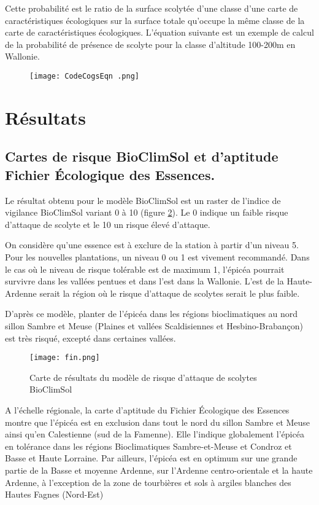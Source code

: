 Cette probabilité est le ratio de la surface scolytée d'une classe d'une carte de caractéristiques écologiques sur la surface totale qu'occupe la même classe de la carte de caractéristiques écologiques.
L'équation suivante est un exemple de calcul de la probabilité de présence de scolyte pour la classe d'altitude 100-200m en Wallonie.

\begin{figure} [htbp] 
    \centering
    \texttt{[image: CodeCogsEqn .png]}
   
    \label{fig:eq}
\end{figure}
\nexpage
\section{Résultats}

\subsection{Cartes de risque BioClimSol et d'aptitude Fichier Écologique des Essences.}
Le résultat obtenu pour le modèle BioClimSol est un raster de l'indice de vigilance BioClimSol variant 0 à 10 (figure \ref{fig:fin}). Le 0 indique un faible risque d’attaque de scolyte et le 10 un risque élevé d’attaque.


On considère qu'une essence est à exclure de la station à partir d'un niveau 5. Pour les nouvelles plantations, un niveau 0 ou 1 est vivement recommandé.  
Dans le cas où le niveau de risque tolérable est de maximum 1, l’épicéa pourrait survivre dans les vallées pentues et dans l’est dans la Wallonie. L'est de la Haute-Ardenne serait la région où le risque d'attaque de scolytes serait le plus faible.

D'après ce modèle, planter de l'épicéa dans les régions bioclimatiques au nord sillon Sambre et Meuse (Plaines et vallées Scaldisiennes et Hesbino-Brabançon) est très risqué, excepté dans certaines vallées.

\begin{figure} [htbp] 
	\centering
	\texttt{[image: fin.png]}
	\caption{Carte de résultats du modèle de risque d'attaque de scolytes BioClimSol}
	\label{fig:fin}
\end{figure}


A l'échelle régionale, la carte d'aptitude du Fichier Écologique des Essences montre que l'épicéa est en exclusion dans tout le nord du sillon Sambre et Meuse ainsi qu'en Calestienne (sud de la Famenne). Elle l'indique globalement l'épicéa en tolérance dans les régions Bioclimatiques Sambre-et-Meuse et Condroz et Basse et Haute Lorraine.
Par ailleurs, l'épicéa est en optimum sur une grande partie de la Basse et moyenne Ardenne, sur l'Ardenne centro-orientale et la haute Ardenne, à l'exception de la zone de tourbières et sols à argiles blanches des Hautes Fagnes (Nord-Est)


